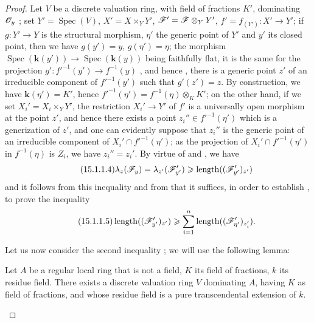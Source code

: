 \begin{proof}
Let $V$ be a discrete valuation ring, with field of fractions $K'$, dominating $\mathscr{O}_y$ ; set $Y'=\operatorname{Spec}(V)$, $X'=X\times_YY'$, $\mathscr{F}'=\mathscr{F}\otimes_YY'$, $f'=f_{(Y')}:X'\to Y'$; if $g:Y'\to Y$ is the structural morphism, $\eta'$ the generic point of $Y'$ and $y'$ its closed point, then we have $g(y')=y$, $g(\eta')=\eta$; the morphism $\operatorname{Spec}(\boldsymbol{k}(y'))\to\operatorname{Spec}(\boldsymbol{k}(y))$ being faithfully flat, it is the same for the projection $g':f'^{-1}(y')\to f^{-1}(y)$ , and hence , there is a generic point $z'$ of an irreducible component of $f'^{-1}(y')$ such that $g'(z')=z$.
By construction, we have $\boldsymbol{k}(\eta')=K'$, hence $f'^{-1}(\eta')=f^{-1}(\eta)\otimes_KK'$; on the other hand, if we set $X_i'=X_i\times_YY'$, the restriction $X_i'\to Y'$ of $f'$ is a universally open morphism at the point $z'$, and hence  there exists a point $z_i''\in f'^{-1}(\eta')$ which is a generization of $z'$, and one can evidently suppose that $z_i''$ is the generic point of an irreducible component of $X_i'\cap f'^{-1}(\eta')$; as the projection of $X_i'\cap f'^{-1}(\eta')$ in $f^{-1}(\eta)$ is $Z_i$, we have $z_i''=z_i'$.
By virtue of  and , we have
\[
\tag{15.1.1.4}
\label{IV.15.1.1.4}
  \lambda_z(\mathscr{F}_y)=\lambda_{z'}(\mathscr{F}'_{y'})\geqslant\operatorname{length}((\mathscr{F}'_{y'})_{z'})
\]
and it follows from this inequality and from  that it suffices, in order to establish , to prove the inequality
\[
\tag{15.1.1.5}
\label{IV.15.1.1.5}
  \operatorname{length}((\mathscr{F}_{y'}')_{z'})\geqslant\sum_{i=1}^{n}\operatorname{length}((\mathscr{F}_{\eta'}')_{z_i'}).
\]

Let us now consider the second inequality ; we will use the following lemma:

\begin{lemma}[15.1.1.6]
\label{IV.15.1.1.6}
Let $A$ be a regular local ring that is not a field, $K$ its field of fractions, $k$ its residue field.
There exists a discrete valuation ring $V$ dominating $A$, having $K$ as field of fractions, and whose residue field is a pure transcendental extension of $k$.
\end{lemma}


\end{proof}
